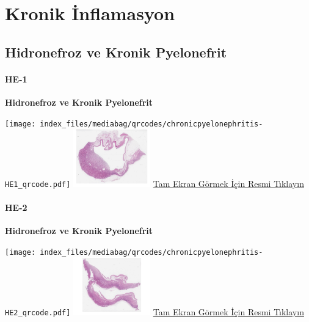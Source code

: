 \documentclass[
  letterpaper,
  DIV=11,
  numbers=noendperiod]{scrreprt}
\begin{document}
\hypertarget{sec-kronik-inflamasyon}{%
\chapter{Kronik İnflamasyon}\label{sec-kronik-inflamasyon}}

\hypertarget{sec-hidronefroz-kronik-pyelonefrit}{%
\section{Hidronefroz ve Kronik
Pyelonefrit}\label{sec-hidronefroz-kronik-pyelonefrit}}

\hypertarget{he-1-2}{%
\subsubsection{HE-1}\label{he-1-2}}

\textbf{Hidronefroz ve Kronik Pyelonefrit}

\texttt{[image: index\_files/mediabag/qrcodes/chronicpyelonephritis-HE1\_qrcode.pdf]}
\href{https://images.patolojiatlasi.com/chronicpyelonephritis/HE1.html}{\includegraphics[width=0.25\textwidth,height=\textheight]{./screenshots/thumbnail_chronicpyelonephritis-1.png}}
\href{https://images.patolojiatlasi.com/chronicpyelonephritis/HE1.html}{Tam
Ekran Görmek İçin Resmi Tıklayın}

\hypertarget{he-2-2}{%
\subsubsection{HE-2}\label{he-2-2}}

\textbf{Hidronefroz ve Kronik Pyelonefrit}

\texttt{[image: index\_files/mediabag/qrcodes/chronicpyelonephritis-HE2\_qrcode.pdf]}
\href{https://images.patolojiatlasi.com/chronicpyelonephritis/HE2.html}{\includegraphics[width=0.25\textwidth,height=\textheight]{./screenshots/thumbnail_chronicpyelonephritis-2.png}}
\href{https://images.patolojiatlasi.com/chronicpyelonephritis/HE2.html}{Tam
Ekran Görmek İçin Resmi Tıklayın}
\end{document}
